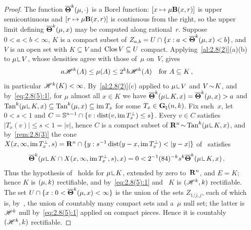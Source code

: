 \begin{proof}
    The function $\boldsymbol{\overline{\Theta}}^{k}(\mu,\cdot)$ is a Borel function: $[x \mapsto \mu
    \mathbf{B}(x,r)]$ is upper semicontinuous and $[r \mapsto \mu \mathbf{B}(x,r)]$ is continuous from
    the right, so the upper limit defining $\boldsymbol{\overline{\Theta}}^{k}(\mu,x)$ may be computed along
    rational~$r$. Suppose $0 < a < b < \infty$, $K$ is a compact subset of $Z_{a,b} = U \cap \{ x
    : a < \boldsymbol{\overline{\Theta}}^{k}(\mu,x) < b \}$, and $V$ is an open set with $K \subseteq V$ and
    $\mathop{\mathrm{Clos}}V \subseteq U$ compact. Applying~\ref{al:2.8(2)}(a)(b) to $\mu \restrict V$, whose
    densities agree with those of~$\mu$ on~$V$, gives
    \begin{equation}
        \label{eq:2.8(5):1}
        a \mathscr{H}^{k}(A) \le \mu(A) \le 2^{k} b \mathscr{H}^{k}(A) \quad \text{for $A \subseteq
        K$} \,,
    \end{equation}
    in particular $\mathscr{H}^{k}(K) < \infty$. By~\ref{al:2.8(2)}(c) applied to $\mu \restrict V$
    and $V \!\sim\! K$, and by~\eqref{eq:2.8(5):1}, for $\mu$ almost all $x \in K$ we have
    $\udensity^{\vdim}(\mu \restrict K, x) = \udensity^{\vdim}(\mu,x) > a$ and
    $\Tan^{\vdim}(\mu \restrict K, x) \subseteq \Tan^{\vdim}(\mu,x) \subseteq \im T_x$ for some
    $T_x \in \mathbf{G}_{\natural}(n,k)$. Fix such~$x$, let $0 < s < 1$ and $C = \mathbb{S}^{n-1} \cap
    \{ v : \operatorname{dist}(v, \operatorname{im} T_x^\perp) \le s \}$. Every $v \in C$ satisfies $|T_x(v)| \le s < 1 =
    |v|$, hence $C$ is a compact subset of $\R^{\adim} \without \Tan^{\vdim}(\mu \restrict K, x)$,
    and by~\ref{rem:2.8(3)} the cone $X(x,\infty,\operatorname{im} T_x^\perp,s) = \mathbf{R}^{n} \cap \{ y :
    s^{-1} \operatorname{dist}(y - x, \operatorname{im} T_x^\perp) < |y - x| \}$ of~\cite[3.3.1]{Federer1969} satisfies
    \begin{displaymath}
        \udensity^{\vdim}(\mu \restrict K \cap X(x,\infty,\im T_x^\perp,s), x) = 0 < 2^{-1}
        (84)^{-\vdim} s^{\vdim} \udensity^{\vdim}(\mu \restrict K, x) \,.
    \end{displaymath}
    Thus the hypothesis of~\cite[3.3.17]{Federer1969} holds for $\mu \restrict K$, extended by
    zero to~$\mathbf{R}^{n}$, and $E = K$; hence $K$ is $(\mu,k)$ rectifiable, and
    by~\eqref{eq:2.8(5):1} and~\cite[3.2.14]{Federer1969} $K$ is $(\mathscr{H}^{k},k)$
    rectifiable. The set $U \cap \{ x : 0 < \boldsymbol{\overline{\Theta}}^{k}(\mu,x) < \infty \}$ is the union of
    the sets $Z_{1/j,j}$, each of which is, by~\cite[2.2.5]{Federer1969}, the union of countably
    many compact sets and a~$\mu$ null set; the latter is $\mathscr{H}^{k}$ null
    by~\eqref{eq:2.8(5):1} applied on compact pieces. Hence it is countably
    $(\mathscr{H}^{k},k)$ rectifiable.


\end{proof}
